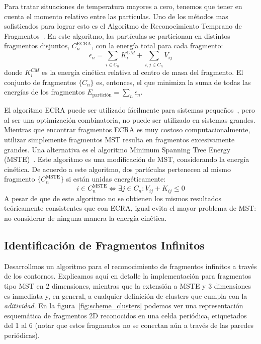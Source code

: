Para tratar situaciones de temperatura mayores a cero, tenemos que tener en cuenta el momento relativo entre las partículas.
Uno de los métodos mas sofisticados para lograr esto es el Algoritmo de Reconocimiento Temprano de Fragmentos~\cite{dorso_early_1993}.
En este algoritmo, las partículas se particionan en distintos fragmentos disjuntos, $C^{\text{ECRA}}_n$, con la energía total para cada fragmento:
\begin{equation*}
  \epsilon_n = \sum_{i \in C_n} K^{CM}_i +  \sum_{i,j \in C_n} V_{ij}
\end{equation*}
donde $K^{CM}_i$ es la energía cinética relativa al centro de masa del fragmento.
El conjunto de fragmentos $\{C_n\}$ es, entonces, el que minimiza la suma de todas las energías de los fragmentos $E_{\text{partición}} = \sum_n \epsilon_n$.

El algoritmo ECRA puede ser utilizado fácilmente para sistemas pequeños~\cite{dorso_fluctuation_1994}, pero al ser una optimización combinatoria, no puede ser utilizado en sistemas grandes.
Mientras que encontrar fragmentos ECRA es muy costoso computacionalmente, utilizar simplemente fragmentos MST resulta en fragmentos excesivamente grandes.
Una alternativa es el algoritmo Minimum Spanning Tree Energy (MSTE)~\cite{dorso_topological_2012}.
Este algoritmo es una modificación de MST, considerando la energía cinética.
De acuerdo a este algoritmo, dos partículas pertenecen al mismo fragmento $\{C^{\text{MSTE}}_n\}$ si están unidas energéticamente:
\begin{equation*}
  i \in C^{\text{MSTE}}_n \Leftrightarrow \exists j \in C_n :  V_{ij}+ K_{ij} \le 0
\end{equation*}
A pesar de que de este algoritmo no se obtienen los mismos resultados teóricamente consistentes que con ECRA, igual evita el mayor problema de MST: no considerar de ninguna manera la energía cinética.

\subsection{Identificación de Fragmentos Infinitos}
Desarrollmos un algoritmo para el reconocimiento de fragmentos infinitos a través de los contornos.
Explicamos aquí en detalle la implementación para fragmentos tipo MST en 2 dimensiones, mientras que la extensión a MSTE y 3 dimensiones es inmediata y, en general, a cualquier definición de clusters que cumpla con la \emph{aditividad}.
En la figura~\ref{fig:scheme_clusters} podemos ver una representación esquemática de fragmentos 2D reconocidos en una celda periódica, etiquetados del 1 al 6 (notar que estos fragmentos no se conectan aún a través de las paredes periódicas).

